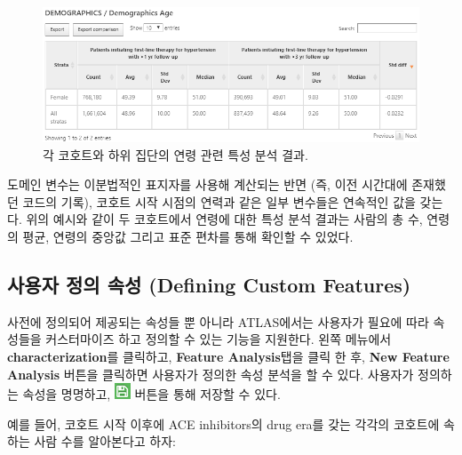 \documentclass[11pt]{book}
\theoremstyle{definition}
\theoremstyle{definition}
\theoremstyle{definition}
\theoremstyle{remark}
\begin{document}
\begin{figure}

{\centering \includegraphics[width=1\linewidth]{images/Characterization/atlasCharacterizationResultsContinuous} 

}

\caption{각 코호트와 하위 집단의 연령 관련 특성 분석 결과.}\label{fig:atlasCharacterizationResultsContinuous}
\end{figure}

도메인 변수는 이분법적인 표지자를 사용해 계산되는 반면 (즉, 이전
시간대에 존재했던 코드의 기록), 코호트 시작 시점의 연력과 같은 일부
변수들은 연속적인 값을 갖는다. 위의 예시와 같이 두 코호트에서 연령에
대한 특성 분석 결과는 사람의 총 수, 연령의 평균, 연령의 중앙값 그리고
표준 편차를 통해 확인할 수 있었다.

\subsection{사용자 정의 속성 (Defining Custom
Features)}\label{---defining-custom-features}

사전에 정의되어 제공되는 속성들 뿐 아니라 ATLAS에서는 사용자가 필요에
따라 속성들을 커스터마이즈 하고 정의할 수 있는 기능을 지원한다. 왼쪽
메뉴에서 \textbf{characterization}를 클릭하고, \textbf{Feature
Analysis}탭을 클릭 한 후, \textbf{New Feature Analysis} 버튼을 클릭하면
사용자가 정의한 속성 분석을 할 수 있다. 사용자가 정의하는 속성을
명명하고, \includegraphics{images/PopulationLevelEstimation/save.png}
버튼을 통해 저장할 수 있다. 

예를 들어, 코호트 시작 이후에 ACE inhibitors의 drug era를 갖는 각각의
코호트에 속하는 사람 수를 알아본다고 하자:
\end{document}
